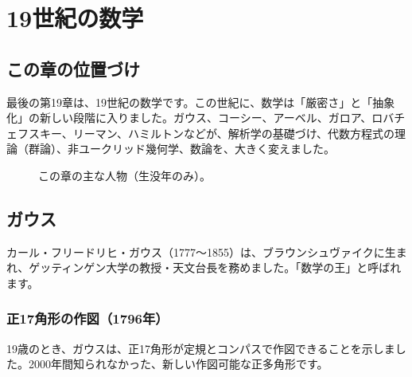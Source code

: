 \documentclass[a4paper,11pt,openany]{ltjsbook}
\begin{document}
\chapter{19世紀の数学}

\section{この章の位置づけ}

最後の第19章は、19世紀の数学です。この世紀に、数学は「厳密さ」と「抽象化」の新しい段階に入りました。ガウス、コーシー、アーベル、ガロア、ロバチェフスキー、リーマン、ハミルトンなどが、解析学の基礎づけ、代数方程式の理論（群論）、非ユークリッド幾何学、数論を、大きく変えました。

\begin{figure}[htbp]
\centering
{}
\caption{この章の主な人物（生没年のみ）。}
\end{figure}

\section{ガウス}

カール・フリードリヒ・ガウス（1777〜1855）は、ブラウンシュヴァイクに生まれ、ゲッティンゲン大学の教授・天文台長を務めました。「数学の王」と呼ばれます。

\subsection{正17角形の作図（1796年）}

19歳のとき、ガウスは、正17角形が定規とコンパスで作図できることを示しました。2000年間知られなかった、新しい作図可能な正多角形です。
\end{document}
